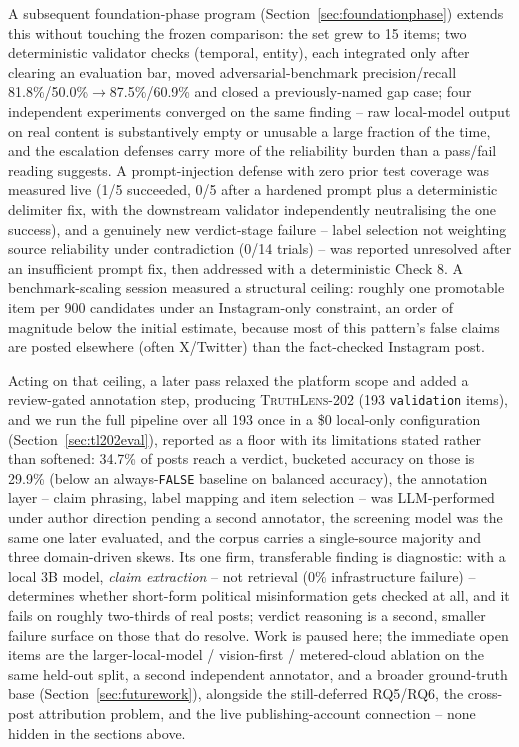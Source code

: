 \documentclass[conference]{IEEEtran}
\begin{document}
A subsequent foundation-phase program
(Section~\ref{sec:foundationphase}) extends this without touching the
frozen comparison: the set grew to 15 items; two deterministic validator
checks (temporal, entity), each integrated only after clearing an
evaluation bar, moved adversarial-benchmark precision/recall
81.8\%/50.0\%$\to$87.5\%/60.9\% and closed a previously-named gap case;
four independent experiments converged on the same finding -- raw
local-model output on real content is substantively empty or unusable a
large fraction of the time, and the escalation defenses carry more of the
reliability burden than a pass/fail reading suggests. A prompt-injection
defense with zero prior test coverage was measured live (1/5 succeeded,
0/5 after a hardened prompt plus a deterministic delimiter fix, with the
downstream validator independently neutralising the one success), and a
genuinely new verdict-stage failure -- label selection not weighting
source reliability under contradiction (0/14 trials) -- was reported
unresolved after an insufficient prompt fix, then addressed with a
deterministic Check 8. A benchmark-scaling session measured a structural
ceiling: roughly one promotable item per 900 candidates under an
Instagram-only constraint, an order of magnitude below the initial
estimate, because most of this pattern's false claims are posted
elsewhere (often X/Twitter) than the fact-checked Instagram post.

Acting on that ceiling, a later pass relaxed the platform scope and added
a review-gated annotation step, producing \textsc{TruthLens-202} (193
\texttt{validation} items), and we run the full pipeline over all 193
once in a \$0 local-only configuration (Section~\ref{sec:tl202eval}),
reported as a floor with its limitations stated rather than softened:
34.7\% of posts reach a verdict, bucketed accuracy on those is 29.9\%
(below an always-\texttt{FALSE} baseline on balanced accuracy), the
annotation layer -- claim phrasing, label mapping and item selection --
was LLM-performed under author direction pending a second annotator, the
screening model was the same one later evaluated, and the corpus carries
a single-source majority and three domain-driven skews. Its one firm, transferable finding is diagnostic:
with a local 3B model, \emph{claim extraction} -- not retrieval (0\%
infrastructure failure) -- determines whether short-form political
misinformation gets checked at all, and it fails on roughly two-thirds
of real posts; verdict reasoning is a second, smaller failure surface on
those that do resolve. Work is paused here; the immediate
open items are the larger-local-model / vision-first / metered-cloud
ablation on the same held-out split, a second independent annotator, and
a broader ground-truth base (Section~\ref{sec:futurework}), alongside the
still-deferred RQ5/RQ6, the cross-post attribution problem, and the live
publishing-account connection -- none hidden in the sections above.
\end{document}
